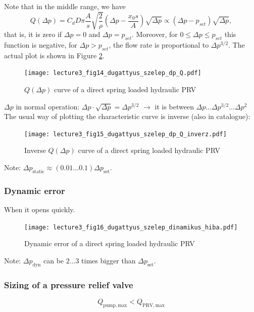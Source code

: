 Note that in the middle range, we have
\begin{equation}
Q(\Delta p)=
C_d D \pi\frac{A}{s} \sqrt{\frac{2}{\rho}} \left( \Delta p - \frac{x_0 s}{A}\right)\sqrt{\Delta p} \propto \left( \Delta p - p_{set}\right)\sqrt{\Delta p},
\end{equation}
%
that is, it is zero if $\Delta p=0$ and $\Delta p =p_{set}$. Moreover, for $0\leq\Delta p \leq p_{set}$ this function is negative, for $\Delta p>p_{set}$, the flow rate is proportional to $\Delta p^{3/2}$. The actual plot is shown in Figure \ref{fig:direct_spring_loaded_PRV_inverse_curve}.


\begin{figure}[tbh]
\begin{center}
\texttt{[image: lecture3\_fig14\_dugattyus\_szelep\_dp\_Q.pdf]}
\caption{\label{fig:direct_spring_loaded_PRV_Q(dp)}$Q(\Delta p)$ curve of a direct spring loaded hydraulic PRV}
\end{center}
\end{figure}
$\Delta p$ in normal operation: $\Delta p\cdot \sqrt{\Delta p}=\Delta p^{3/2}$ $\rightarrow$ it is between $\Delta p\dots \Delta p^{3/2}\dots \Delta p^2$
The usual way of plotting the characteristic curve is inverse (also in catalogue):
\begin{figure}[tbh]
\begin{center}
\texttt{[image: lecture3\_fig15\_dugattyus\_szelep\_dp\_Q\_inverz.pdf]}
\caption{\label{fig:direct_spring_loaded_PRV_inverse_curve}Inverse $Q(\Delta p)$ curve of a direct spring loaded hydraulic PRV}
\end{center}
\end{figure}
Note: $\Delta p_{\mathrm{static}}\approx (0.01\dots 0.1)\Delta p_{\mathrm{set}}$.
\subsubsection{Dynamic error}
When it opens quickly.
\begin{figure}[tbh]
\begin{center}
\texttt{[image: lecture3\_fig16\_dugattyus\_szelep\_dinamikus\_hiba.pdf]}
\caption{\label{fig:dynamic_error_of_direct_spring_loaded_PRV}Dynamic error of a direct spring loaded hydraulic PRV}
\end{center}
\end{figure}
Note: $\Delta p_{\mathrm{dyn}}$ can be $2\dots 3$ times bigger than $\Delta p_{\mathrm{set}}$.
\subsubsection{Sizing of a pressure relief valve}
\begin{equation}
Q_{\mathrm{pump,max}}<Q_{\mathrm{PRV,max}}
\end{equation}

